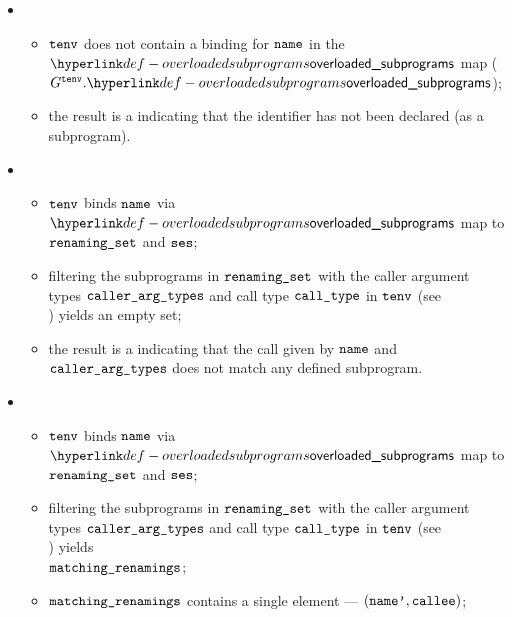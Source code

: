 \ProseParagraph
\OneApplies
\begin{itemize}
  \item {}
  \begin{itemize}
    \item $\tenv$ does not contain a binding for $\name$ in the $\overloadedsubprograms$ map
          ($G^\tenv.\overloadedsubprograms$);
    \item the result is a \typingerrorterm{} indicating that the identifier has not been declared (as a subprogram).
  \end{itemize}

  \item {}
  \begin{itemize}
    \item $\tenv$ binds $\name$ via $\overloadedsubprograms$ map to $\renamingset$ and $\vses$;
    \item filtering the subprograms in $\renamingset$ with the caller argument types $\callerargtypes$
          and call type $\calltype$ in $\tenv$ (see \\ ) yields an empty set\ProseOrTypeError;
    \item the result is a \typingerrorterm{} indicating that the call given by $\name$ and \\ $\callerargtypes$
          does not match any defined subprogram.
  \end{itemize}

  \item {}
  \begin{itemize}
    \item $\tenv$ binds $\name$ via $\overloadedsubprograms$ map to $\renamingset$ and $\vses$;
    \item filtering the subprograms in $\renamingset$ with the caller argument types $\callerargtypes$
          and call type $\calltype$ in $\tenv$ (see \\ ) yields \\
          $\matchingrenamings$\ProseOrTypeError;
    \item $\matchingrenamings$ contains a single element --- $(\namep, \callee)$\ProseOrTypeError;
  \end{itemize}
\end{itemize}

\FormallyParagraph
\begin{mathpar}
\end{mathpar}

